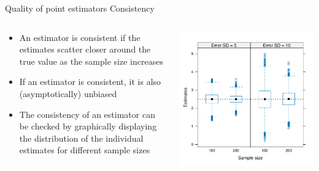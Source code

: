 \documentclass[aspectratio=169]{beamer}
\begin{document}
\begin{frame}{Quality of point estimators}
{Consistency}
  \begin{columns}
    \begin{column}{.5\textwidth}
\begin{itemize}
  \item An estimator is consistent if the estimates scatter closer around the
    true value as the sample size increases
  \item If an estimator is consistent, it is also (asymptotically) unbiased
  \item The consistency of an estimator can be checked by graphically displaying
    the distribution of the individual estimates for different sample sizes
\end{itemize}
    \end{column}
    \begin{column}{.5\textwidth}
      \includegraphics[scale = .57]{../figures/boxplot_simstudy_example1}
    \end{column}
  \end{columns}
\end{frame}
\end{document}
